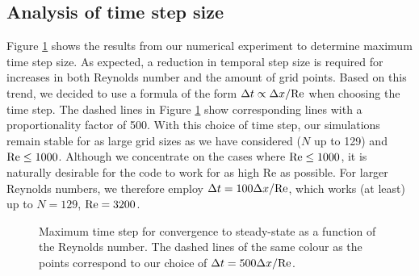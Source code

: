 \documentclass[final,3p,twocolumn]{elsarticle}
\begin{document}
\subsection{Analysis of time step size}
\label{subsec:timeStep}

Figure \ref{fig:dt} shows the results from our numerical experiment to
determine maximum time step size. As expected, a reduction in temporal step
size is required for increases in both Reynolds number and the amount of grid
points. Based on this trend, we decided to use a formula of the form $\Delta t
\propto \Delta x / {\rm Re}$ when choosing the time step. The dashed lines in
Figure \ref{fig:dt} show corresponding lines with a proportionality factor of
500. With this choice of time step, our simulations remain stable for as large
grid sizes as we have considered ($N$ up to 129) and ${\rm Re} \leq 1000$.
Although we concentrate on the cases where ${\rm Re} \leq 1000$, it is
naturally desirable for the code to work for as high Re as possible. For larger
Reynolds numbers, we therefore employ $\Delta t = 100 \Delta x / {\rm Re}$,
which works (at least) up to $N=129$, ${\rm Re}=3200$. 

\begin{figure}[htb]
    \centering
    \caption
    {
        Maximum time step for convergence to steady-state as a function of the
        Reynolds number. The dashed lines of the same colour as the points
        correspond to our choice of $\Delta t = 500 \Delta x / {\rm Re}$. 
    }
    \label{fig:dt}
\end{figure}
\end{document}
